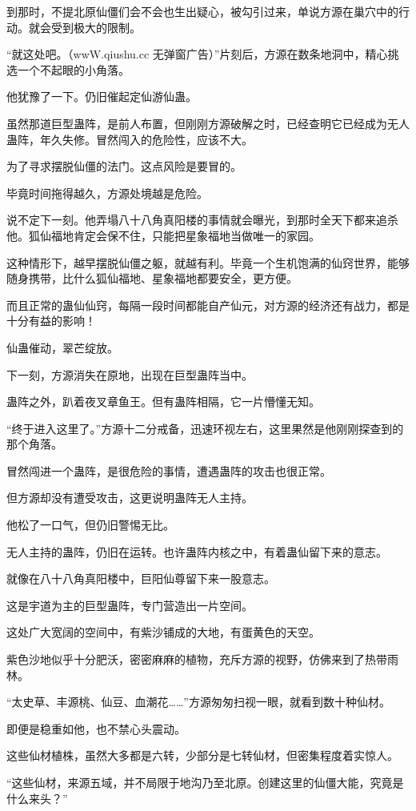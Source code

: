 \begin{this_body}
到那时，不提北原仙僵们会不会也生出疑心，被勾引过来，单说方源在巢穴中的行动。就会受到极大的限制。

“就这处吧。（wwW.qiushu.cc 无弹窗广告）”片刻后，方源在数条地洞中，精心挑选一个不起眼的小角落。

他犹豫了一下。仍旧催起定仙游仙蛊。

虽然那道巨型蛊阵，是前人布置，但刚刚方源破解之时，已经查明它已经成为无人蛊阵，年久失修。冒然闯入的危险性，应该不大。

为了寻求摆脱仙僵的法门。这点风险是要冒的。

毕竟时间拖得越久，方源处境越是危险。

说不定下一刻。他弄塌八十八角真阳楼的事情就会曝光，到那时全天下都来追杀他。狐仙福地肯定会保不住，只能把星象福地当做唯一的家园。

这种情形下，越早摆脱仙僵之躯，就越有利。毕竟一个生机饱满的仙窍世界，能够随身携带，比什么狐仙福地、星象福地都要安全，更方便。

而且正常的蛊仙仙窍，每隔一段时间都能自产仙元，对方源的经济还有战力，都是十分有益的影响！

仙蛊催动，翠芒绽放。

下一刻，方源消失在原地，出现在巨型蛊阵当中。

蛊阵之外，趴着夜叉章鱼王。但有蛊阵相隔，它一片懵懂无知。

“终于进入这里了。”方源十二分戒备，迅速环视左右，这里果然是他刚刚探查到的那个角落。

冒然闯进一个蛊阵，是很危险的事情，遭遇蛊阵的攻击也很正常。

但方源却没有遭受攻击，这更说明蛊阵无人主持。

他松了一口气，但仍旧警惕无比。

无人主持的蛊阵，仍旧在运转。也许蛊阵内核之中，有着蛊仙留下来的意志。

就像在八十八角真阳楼中，巨阳仙尊留下来一股意志。

这是宇道为主的巨型蛊阵，专门营造出一片空间。

这处广大宽阔的空间中，有紫沙铺成的大地，有蛋黄色的天空。

紫色沙地似乎十分肥沃，密密麻麻的植物，充斥方源的视野，仿佛来到了热带雨林。

“太史草、丰源桃、仙豆、血潮花……”方源匆匆扫视一眼，就看到数十种仙材。

即便是稳重如他，也不禁心头震动。

这些仙材植株，虽然大多都是六转，少部分是七转仙材，但密集程度着实惊人。

“这些仙材，来源五域，并不局限于地沟乃至北原。创建这里的仙僵大能，究竟是什么来头？”


\end{this_body}
